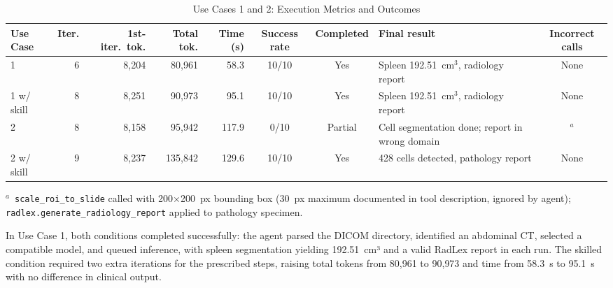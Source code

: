 \documentclass[conference]{IEEEtran}
\begin{document}
\begin{table}[t]
  \caption{Use Cases 1 and 2: Execution Metrics and Outcomes}
  \label{tab:uc1-results}
  \centering
  \small
  \begin{tabular}{lrrrrccp{4cm}c}
    \toprule
    Use Case & Iter. & 1st-iter.\ tok. & Total tok. & Time (s) & Success rate & Completed & Final result & Incorrect calls \\
    \midrule
    1               & 6 & 8{,}204  & 80{,}961  & 58.3  & 10/10 & Yes     & Spleen 192.51~cm$^{3}$, radiology report       & None \\
    1 w/ skill      & 8 & 8{,}251  & 90{,}973  & 95.1  & 10/10 & Yes     & Spleen 192.51~cm$^{3}$, radiology report       & None \\
    2               & 8 & 8{,}158  & 95{,}942  & 117.9 & 0/10  & Partial & Cell segmentation done; report in wrong domain & $^{a}$ \\
    2 w/ skill      & 9 & 8{,}237  & 135{,}842 & 129.6 & 10/10 & Yes     & 428 cells detected, pathology report           & None \\
    \bottomrule
  \end{tabular}
  \par\smallskip
  \raggedright\footnotesize
  $^{a}$~\texttt{scale\_roi\_to\_slide} called with 200$\times$200~px bounding box (30~px maximum documented in tool description, ignored by agent); \texttt{radlex.generate\_radiology\_report} applied to pathology specimen.
\end{table}

In Use Case 1, both conditions completed successfully: the agent parsed the DICOM directory, identified an abdominal CT, selected a compatible model, and queued inference, with spleen segmentation yielding 192.51~cm³ and a valid RadLex report in each run. The skilled condition required two extra iterations for the prescribed steps, raising total tokens from 80{,}961 to 90{,}973 and time from 58.3~s to 95.1~s with no difference in clinical output.
\end{document}
